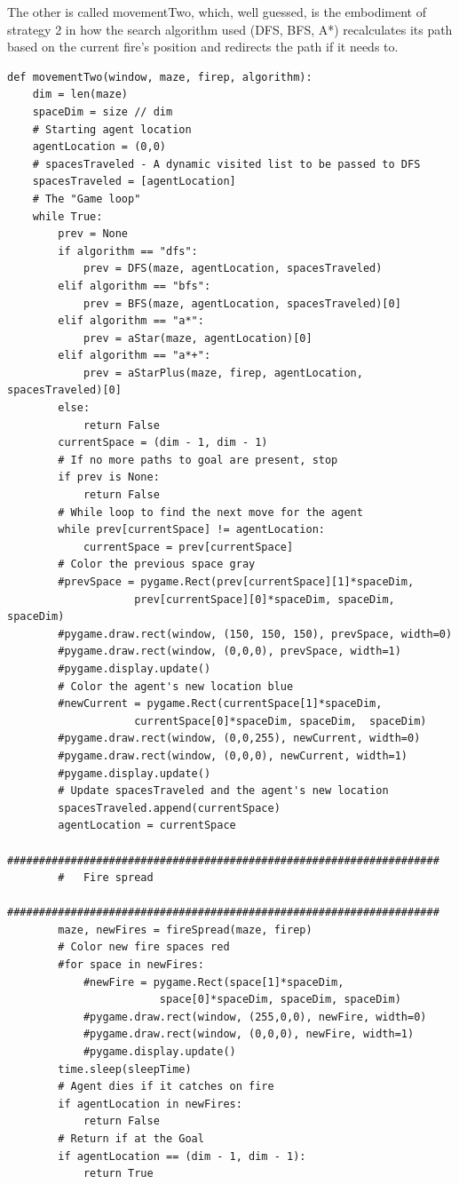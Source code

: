 \documentclass[11pt]{article}
\begin{document}
The other is called movementTwo, which, well guessed, is the embodiment of strategy 2 in how the search algorithm used (DFS, BFS, A*) recalculates its path based on the current fire's position and redirects the path if it needs to.

\begin{verbatim}
def movementTwo(window, maze, firep, algorithm):
    dim = len(maze)
    spaceDim = size // dim
    # Starting agent location
    agentLocation = (0,0)
    # spacesTraveled - A dynamic visited list to be passed to DFS
    spacesTraveled = [agentLocation]
    # The "Game loop"
    while True:
        prev = None
        if algorithm == "dfs":
            prev = DFS(maze, agentLocation, spacesTraveled)
        elif algorithm == "bfs":
            prev = BFS(maze, agentLocation, spacesTraveled)[0]
        elif algorithm == "a*":
            prev = aStar(maze, agentLocation)[0]
        elif algorithm == "a*+":
            prev = aStarPlus(maze, firep, agentLocation, spacesTraveled)[0]
        else:
            return False
        currentSpace = (dim - 1, dim - 1)
        # If no more paths to goal are present, stop
        if prev is None:
            return False
        # While loop to find the next move for the agent
        while prev[currentSpace] != agentLocation:
            currentSpace = prev[currentSpace]
        # Color the previous space gray
        #prevSpace = pygame.Rect(prev[currentSpace][1]*spaceDim,
        			prev[currentSpace][0]*spaceDim, spaceDim, spaceDim)
        #pygame.draw.rect(window, (150, 150, 150), prevSpace, width=0)
        #pygame.draw.rect(window, (0,0,0), prevSpace, width=1)
        #pygame.display.update()
        # Color the agent's new location blue
        #newCurrent = pygame.Rect(currentSpace[1]*spaceDim,
        			currentSpace[0]*spaceDim, spaceDim,  spaceDim)
        #pygame.draw.rect(window, (0,0,255), newCurrent, width=0)
        #pygame.draw.rect(window, (0,0,0), newCurrent, width=1)
        #pygame.display.update()
        # Update spacesTraveled and the agent's new location
        spacesTraveled.append(currentSpace)
        agentLocation = currentSpace
        ####################################################################
        #   Fire spread
        ####################################################################
        maze, newFires = fireSpread(maze, firep)
        # Color new fire spaces red
        #for space in newFires:
            #newFire = pygame.Rect(space[1]*spaceDim, 
            			space[0]*spaceDim, spaceDim, spaceDim)
            #pygame.draw.rect(window, (255,0,0), newFire, width=0)
            #pygame.draw.rect(window, (0,0,0), newFire, width=1)
            #pygame.display.update()
        time.sleep(sleepTime)
        # Agent dies if it catches on fire
        if agentLocation in newFires:
            return False
        # Return if at the Goal
        if agentLocation == (dim - 1, dim - 1):
            return True
\end{verbatim}
\end{document}
